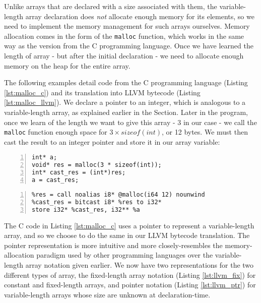 Unlike arrays that are declared with a size associated with them, the variable-length array declaration does \textit{not} allocate enough memory for its elements, so we need to implement the memory management for such arrays ourselves. Memory allocation comes in the form of the \verb|malloc| function, which works in the same way as the version from the C programming language. Once we have learned the length of array - but after the initial declaration - we need to allocate enough memory on the heap for the entire array.

The following examples detail code from the C programming language (Listing \ref{lst:malloc_c}) and its translation into LLVM bytecode (Listing \ref{lst:malloc_llvm}). We declare a pointer to an integer, which is analogous to a variable-length array, as explained earlier in the Section. Later in the program, once we learn of the length we want to give this array - 3 in our case - we call the \verb|malloc| function enough space for $3 \times sizeof(int)$, or 12 bytes. We must then cast the result to an integer pointer and store it in our array variable:

\lstset{
	language=C,
	basicstyle=\small,
	stringstyle=\ttfamily
}
\begin{lstlisting}[frame=single, numbers=left, numberstyle=\tiny, caption={C malloc}, label=lst:malloc_c]
int* a;
void* res = malloc(3 * sizeof(int));
int* cast_res = (int*)res;
a = cast_res;
\end{lstlisting}


\lstset{
	language=Assembly,
	basicstyle=\small,
	stringstyle=\ttfamily
}
\begin{lstlisting}[frame=single, numbers=left, numberstyle=\tiny, caption={LLVM malloc}, label=lst:malloc_llvm]
%a = alloca i32*
%res = call noalias i8* @malloc(i64 12) nounwind
%cast_res = bitcast i8* %res to i32*
store i32* %cast_res, i32** %a
\end{lstlisting}

The C code in Listing \ref{lst:malloc_c} uses a pointer to represent a variable-length array, and so we choose to do the same in our LLVM bytecode translation. The pointer representation is more intuitive and more closely-resembles the memory-allocation paradigm used by other programming languages over the variable-length array notation given earlier. We now have two representations for the two different types of array, the fixed-length array notation (Listing \ref{lst:llvm_fix}) for constant and fixed-length arrays, and pointer notation (Listing \ref{lst:llvm_ptr}) for variable-length arrays whose size are unknown at declaration-time.

